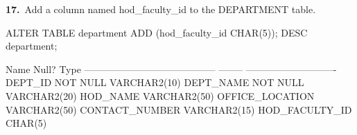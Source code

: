 
\noindent\begin{minipage}{\linewidth}
\begingroup{}
{\fontsize{14}{17}\selectfont\textbf{17.}}\ Add a column named hod\_faculty\_id to the DEPARTMENT table.\par
\endgroup\vspace{12pt}


\begin{sqlcode}
ALTER TABLE department ADD (hod_faculty_id CHAR(5));
DESC department;
\end{sqlcode}

\vspace{18pt}


\begin{sqlout}
 Name                                      Null?    Type
 ----------------------------------------- -------- ----------------------------
 DEPT_ID                                   NOT NULL VARCHAR2(10)
 DEPT_NAME                                 NOT NULL VARCHAR2(20)
 HOD_NAME                                           VARCHAR2(50)
 OFFICE_LOCATION                                    VARCHAR2(50)
 CONTACT_NUMBER                                     VARCHAR2(15)
 HOD_FACULTY_ID                                     CHAR(5)
\end{sqlout}
\end{minipage}\par\vspace{30pt}

